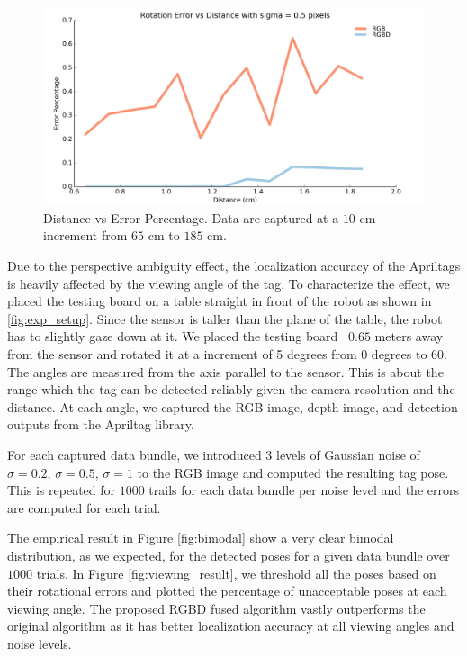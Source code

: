 \begin{figure}
\centering
\includegraphics[width=\columnwidth]{figs/distance_fig2}
\caption{Distance vs Error Percentage. Data are captured at a $10$ cm increment from $65$ cm to $185$ cm.}
\label{fig:distance_result}
\end{figure}

Due to the perspective ambiguity effect, the localization accuracy of the Apriltags is heavily affected by the viewing angle of the tag. To characterize the effect, we placed the testing board on a table straight in front of the robot as shown in \ref{fig:exp_setup}. Since the sensor is taller than the plane of the table, the robot has to slightly gaze down at it. We placed the testing board ~$0.65$ meters away from the sensor and rotated it at a increment of 5 degrees from 0 degrees to 60. The angles are measured from the axis parallel to the sensor. This is about the range which the tag can be detected reliably given the camera resolution and the distance. At each angle, we captured the RGB image, depth image, and detection outputs from the Apriltag library. 

For each captured data bundle, we introduced 3 levels of Gaussian noise of $\sigma = 0.2$, $\sigma = 0.5$, $\sigma = 1$  to the RGB image and computed the resulting tag pose. This is repeated for $1000$ trails for each data bundle per noise level and the errors are computed for each trial.  

The empirical result in Figure \ref{fig:bimodal} show a very clear bimodal distribution, as we expected, for the detected poses for a given data bundle over $1000$ trials. In Figure \ref{fig:viewing_result}, we threshold all the poses based on their rotational errors and plotted the percentage of unacceptable poses at each viewing angle. The proposed RGBD fused algorithm vastly outperforms the original algorithm as it has better localization accuracy at all viewing angles and noise levels. 

